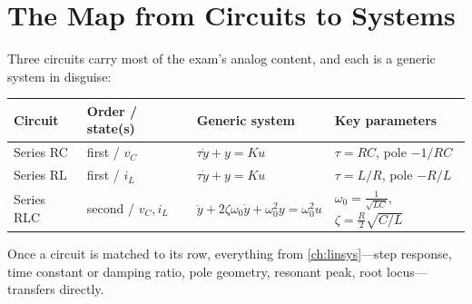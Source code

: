 \section{The Map from Circuits to Systems}
Three circuits carry most of the exam's analog content, and each is a generic
system in disguise:

\begin{center}
\begin{tabularx}{\textwidth}{@{}L{0.15\textwidth}L{0.19\textwidth}L{0.24\textwidth}Y@{}}
\toprule
Circuit & Order / state(s) & Generic system & Key parameters \\
\midrule
Series RC & first / \(v_C\) & \(\tau\dot y+y=Ku\) & \(\tau=RC\), pole \(-1/RC\) \\
Series RL & first / \(i_L\) & \(\tau\dot y+y=Ku\) & \(\tau=L/R\), pole \(-R/L\) \\
Series RLC & second / \(v_C,i_L\) & \(\ddot y+2\zeta\omega_0\dot y+\omega_0^2 y=\omega_0^2u\) & \(\omega_0=\tfrac{1}{\sqrt{LC}}\), \(\zeta=\tfrac{R}{2}\sqrt{C/L}\) \\
\bottomrule
\end{tabularx}
\end{center}

Once a circuit is matched to its row, everything from \cref{ch:linsys}---step
response, time constant or damping ratio, pole geometry, resonant peak, root
locus---transfers directly.
